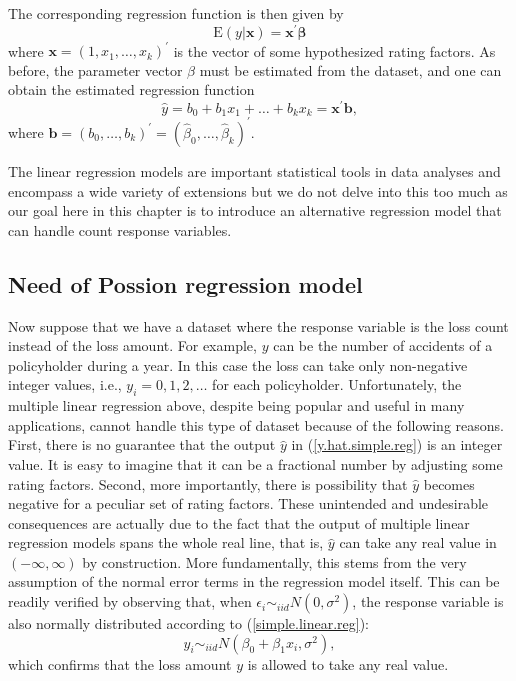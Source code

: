\documentclass[12pt]{article}
\def\E{\mathrm{E}}
\begin{document}
The corresponding regression function is then given by
\begin{equation}
\label{mult.linear.reg.ft3}
\E({ y}|\mathbf{ x})=\mathbf{ x^{\prime}\beta}
\end{equation} where $\mathbf{ x}=(1, x_1, \ldots, x_k)^{\prime}$ is the vector of some hypothesized rating factors. As before, the parameter vector $\beta$ must be estimated from the dataset, and one can obtain the estimated regression function 
\begin{equation}
\label{mult.linear.reg.ft4}
\hat{ y}= b_0+b_1 x_1+ \ldots +b_k x_k= \mathbf{ x^{\prime}b},
\end{equation}
where  $\mathbf{ b}=(b_0, \ldots, b_k)^{\prime}=(\hat{\beta}_0, \ldots, \hat{\beta}_k)^{\prime}$. 

The linear regression models are important statistical tools in data analyses and encompass a wide variety of extensions but we do not delve into this too much as our goal here in this chapter is to introduce an alternative regression model that can handle count response variables.

\subsection{Need of Possion regression model} 
Now suppose that we have a dataset where the response variable is the loss count instead of the loss amount. For example, $y$ can be the number of accidents of a policyholder during a year. In this case the loss can take only non-negative integer values, i.e., $y_i=0,1,2, \ldots$ for each policyholder. Unfortunately, the multiple linear regression above, despite being popular and useful in many applications, cannot handle this 
type of dataset because of the following reasons. First, there is no guarantee that the output $\hat{y}$ in (\ref{y.hat.simple.reg}) is an integer value. It is easy to imagine that it can be a fractional number by adjusting some rating factors. Second, more importantly, there is possibility that $\hat{y}$ becomes negative for a peculiar set of rating factors. These unintended and undesirable consequences are actually due to the fact that the output of multiple linear regression models spans the whole real line, that is, $\hat{y}$ can take any real value in $(-\infty, \infty)$ by construction. More fundamentally, this stems from the very assumption of the normal error terms in the regression model itself. This can be readily verified by observing that, when  $\epsilon_i \sim_{iid} N(0, \sigma^2)$, the response variable is also normally distributed  according to (\ref{simple.linear.reg}):
\begin{equation}
\label{ }
y_i \sim_{iid} N(\beta_0+\beta_1x_i, \sigma^2),
\end{equation}
which confirms that the loss amount $y$ is allowed to take any real value.
\end{document}
